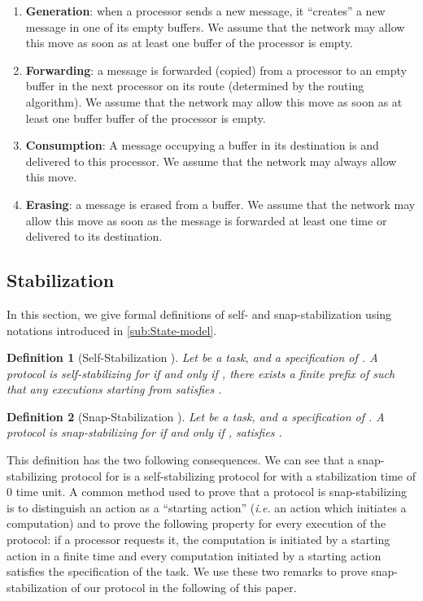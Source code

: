 \documentclass[11pt]{article}
\newtheorem{definition}{Definition}
\begin{document}
\begin{enumerate}
\item \textbf{Generation}: when a processor sends a new message, it ``creates'' a new message in one of its empty buffers. We assume that the network may allow this move as soon as at least one buffer of the processor is empty. 
\item \textbf{Forwarding}: a message  is forwarded (copied) from a processor  to an empty buffer in the next processor  on its route (determined by the routing algorithm). We assume that the network may allow this move as soon as at least one buffer buffer of the processor is empty. 
\item \textbf{Consumption}: A message  occupying a buffer in its destination is and delivered to this processor. We assume that the network may always allow this move. 
\item \textbf{Erasing}: a message  is erased from a buffer. We assume that the network may allow this move as soon as the message is forwarded at least one time or delivered to its destination.
\end{enumerate}

\subsection{Stabilization}\label{sub:Stabilization}

In this section, we give formal definitions of self- and snap-stabilization using notations introduced in \ref{sub:State-model}.

\begin{definition} [Self-Stabilization \cite{D74}] \label{def:self}
Let  be a task, and  a specification of . A protocol  is self-stabilizing for  if and only if , there exists a finite prefix  of  such that any executions starting from  satisfies .
\end{definition}

\begin{definition} [Snap-Stabilization \cite{BDPV99,BDPV07}] \label{def:snap}
Let  be a task, and  a specification of . A protocol  is snap-stabilizing for  if and only if ,  satisfies .
\end{definition}

This definition has the two following consequences. We can see that a snap-stabilizing protocol for  is a self-stabilizing protocol for  with a stabilization time of 0 time unit. A common method used to prove that a protocol is snap-stabilizing is to distinguish an action as a ``starting action'' (\emph{i.e.} an action which initiates a computation) and to prove the following property for every execution of the protocol: if a processor requests it, the computation is initiated by a starting action in a finite time and every computation initiated by a starting action satisfies the specification of the task. We use these two remarks to prove snap-stabilization of our protocol in the following of this paper.
\end{document}
